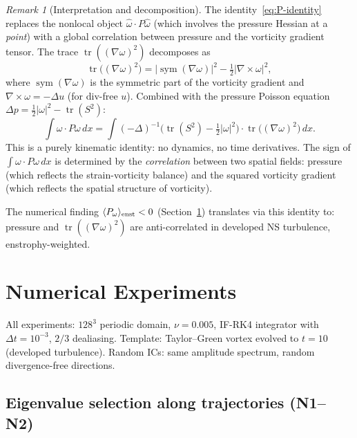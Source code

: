 \documentclass[11pt,a4paper]{article}
\theoremstyle{plain}
\theoremstyle{definition}
\theoremstyle{remark}
\newtheorem{remark}[theorem]{Remark}
\DeclareMathOperator{\tr}{tr}
\DeclareMathOperator{\sym}{sym}
\begin{document}
\begin{remark}[Interpretation and decomposition]
\label{rem:P-identity-interp}
The identity~\eqref{eq:P-identity} replaces the
nonlocal object $\hat\omega\cdot P\hat\omega$ (which
involves the pressure Hessian at a \emph{point}) with
a global correlation between pressure and the
vorticity gradient tensor.  The trace
$\tr((\nabla\omega)^2)$ decomposes as
\begin{equation}\label{eq:trace-decomp}
\tr\bigl((\nabla\omega)^2\bigr)
= |\sym(\nabla\omega)|^2
- \tfrac{1}{2}|\nabla\times\omega|^2,
\end{equation}
where $\sym(\nabla\omega)$ is the symmetric part
of the vorticity gradient and
$\nabla\times\omega = -\Delta u$ (for div-free $u$).
Combined with the pressure Poisson equation
$\Delta p = \frac{1}{2}|\omega|^2-\tr(S^2)$:
\begin{equation}\label{eq:P-kinematic}
\int\omega\cdot P\omega\,dx
= \int(-\Delta)^{-1}
\bigl(\tr(S^2)-\tfrac{1}{2}|\omega|^2\bigr)
\cdot\tr\bigl((\nabla\omega)^2\bigr)\,dx.
\end{equation}
This is a purely kinematic identity: no dynamics,
no time derivatives.  The sign of
$\int\omega\cdot P\omega\,dx$ is determined by the
\emph{correlation} between two spatial fields:
pressure (which reflects the strain-vorticity
balance) and the squared vorticity gradient (which
reflects the spatial structure of vorticity).

The numerical finding $\langle P_\omega\rangle
_{\rm enst} < 0$
(Section~\ref{sec:numerics}) translates via this
identity to: pressure and
$\tr((\nabla\omega)^2)$ are anti-correlated
in developed NS turbulence,
enstrophy-weighted.
\end{remark}


\section{Numerical Experiments}\label{sec:numerics}

All experiments: $128^3$ periodic domain, $\nu=0.005$,
IF-RK4 integrator with $\Delta t=10^{-3}$, $2/3$
dealiasing.  Template: Taylor--Green vortex evolved
to $t=10$ (developed turbulence).  Random ICs:
same amplitude spectrum, random divergence-free
directions.

\subsection{Eigenvalue selection along trajectories
(N1--N2)}
\end{document}
